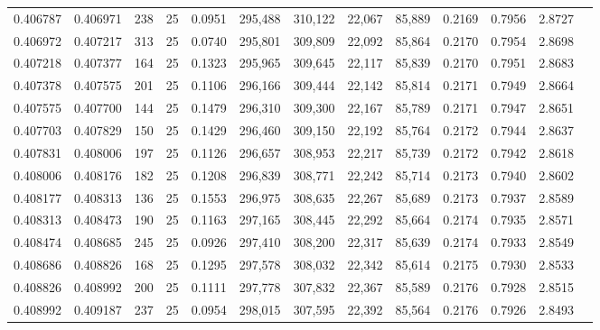 \begin{tabular}{rrrrrrrrrrrrr}
0.406787 & 0.406971 &   238 &  25 &                                     0.0951 & 295,488 & 310,122 &  22,067 &  85,889 & 0.2169 & 0.7956 & 2.8727 \\
0.406972 & 0.407217 &   313 &  25 &                                     0.0740 & 295,801 & 309,809 &  22,092 &  85,864 & 0.2170 & 0.7954 & 2.8698 \\
0.407218 & 0.407377 &   164 &  25 &                                     0.1323 & 295,965 & 309,645 &  22,117 &  85,839 & 0.2170 & 0.7951 & 2.8683 \\
0.407378 & 0.407575 &   201 &  25 &                                     0.1106 & 296,166 & 309,444 &  22,142 &  85,814 & 0.2171 & 0.7949 & 2.8664 \\
0.407575 & 0.407700 &   144 &  25 &                                     0.1479 & 296,310 & 309,300 &  22,167 &  85,789 & 0.2171 & 0.7947 & 2.8651 \\
0.407703 & 0.407829 &   150 &  25 &                                     0.1429 & 296,460 & 309,150 &  22,192 &  85,764 & 0.2172 & 0.7944 & 2.8637 \\
0.407831 & 0.408006 &   197 &  25 &                                     0.1126 & 296,657 & 308,953 &  22,217 &  85,739 & 0.2172 & 0.7942 & 2.8618 \\
0.408006 & 0.408176 &   182 &  25 &                                     0.1208 & 296,839 & 308,771 &  22,242 &  85,714 & 0.2173 & 0.7940 & 2.8602 \\
0.408177 & 0.408313 &   136 &  25 &                                     0.1553 & 296,975 & 308,635 &  22,267 &  85,689 & 0.2173 & 0.7937 & 2.8589 \\
0.408313 & 0.408473 &   190 &  25 &                                     0.1163 & 297,165 & 308,445 &  22,292 &  85,664 & 0.2174 & 0.7935 & 2.8571 \\
0.408474 & 0.408685 &   245 &  25 &                                     0.0926 & 297,410 & 308,200 &  22,317 &  85,639 & 0.2174 & 0.7933 & 2.8549 \\
0.408686 & 0.408826 &   168 &  25 &                                     0.1295 & 297,578 & 308,032 &  22,342 &  85,614 & 0.2175 & 0.7930 & 2.8533 \\
0.408826 & 0.408992 &   200 &  25 &                                     0.1111 & 297,778 & 307,832 &  22,367 &  85,589 & 0.2176 & 0.7928 & 2.8515 \\
0.408992 & 0.409187 &   237 &  25 &                                     0.0954 & 298,015 & 307,595 &  22,392 &  85,564 & 0.2176 & 0.7926 & 2.8493 \\

\end{tabular}

